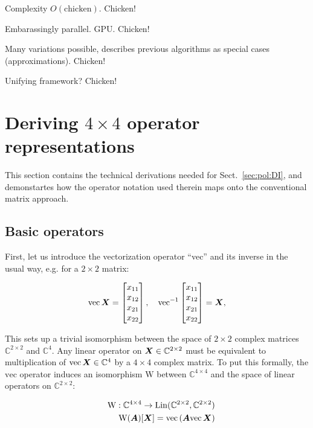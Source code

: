 \documentclass[useAMS,usenatbib]{mn2e}
\newcommand{\COMPLEX}{\mathbb{C}}
\newcommand{\mat}[1]{{\bmath{#1}}}
\begin{document}
Complexity $O(\mathrm{chicken}).$ Chicken!

Embarassingly parallel. GPU. Chicken!

Many variations possible, describes previous algorithms as special cases (approximations). Chicken!

Unifying framework? Chicken!




\appendix

\section{Deriving $4\times4$ operator representations}
\label{sec:4x4app}

This section contains the technical derivations needed for Sect.~\ref{sec:pol:DI}, and demonstartes how the
operator notation used therein maps onto the conventional matrix approach.

\subsection{Basic operators}

First, let us introduce the vectorization operator ``vec'' and its inverse in the usual way, e.g. for a $2\times2$ matrix:

\newcommand{\VEC}[1]{\mathrm{vec}\,{#1}}
\newcommand{\VECINV}[1]{\mathrm{vec}^{-1}\,{#1}}

\[
\VEC{\mat{X}} = \Matrix{c}{x_{11}\\x_{12}\\x_{21}\\x_{22}},~~~
\VECINV{\Matrix{c}{x_{11}\\x_{12}\\x_{21}\\x_{22}}} = \mat{X},
\]

This sets up a trivial isomorphism between the space of $2\times2$ complex matrices $\COMPLEX^{2\times2}$ and $\COMPLEX^4$. 
Any linear operator on $\mat{X} \in \COMPLEX^{2\times2}$ must be equivalent to multiplication of $\VEC{\mat{X}} \in \COMPLEX^4$ by 
a $4\times 4$ complex matrix. To put this formally, the $\mathrm{vec}$ operator induces an isomorphism 
$\mathrm{W}$ between $\COMPLEX^{4\times4}$ and the space of linear operators on $\COMPLEX^{2\times2}$:

\begin{eqnarray}
&& \mathrm{W}:\COMPLEX^{4\times4}\to\mathrm{Lin}(\COMPLEX^{2\times2},\COMPLEX^{2\times2}) \nonumber\\
&& \mathrm{W}(\mat{A})[\mat{X}] = \VEC{(\mat{A}\VEC{\mat{X}})} \label{eq:iso:W}
\end{eqnarray}
\end{document}
